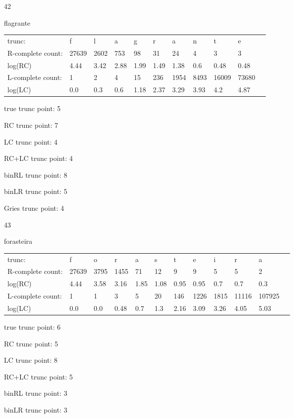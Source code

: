 \documentclass[10pt]{article}
\begin{document}
\vspace{1em}

42

flagrante

\begin{tabular}{l|llllllllll}
trunc: & f & l & a & g & r & a & n & t & e & \\ 
R-complete count: & 27639 & 2602 & 753 & 98 & 31 & 24 & 4 & 3 & 3 & \\ 
log(RC) & 4.44 & 3.42 & 2.88 & 1.99 & 1.49 & 1.38 & 0.6 & 0.48 & 0.48 & \\ 
L-complete count: & 1 & 2 & 4 & 15 & 236 & 1954 & 8493 & 16009 & 73680 & \\ 
log(LC) & 0.0 & 0.3 & 0.6 & 1.18 & 2.37 & 3.29 & 3.93 & 4.2 & 4.87 & \\ 
\end{tabular}

true trunc point: 5

RC trunc point: 7

LC trunc point: 4

RC+LC trunc point: 4

binRL trunc point: 8

binLR trunc point: 5

Gries trunc point: 4

\vspace{1em}

43

forasteira

\begin{tabular}{l|lllllllllll}
trunc: & f & o & r & a & s & t & e & i & r & a & \\ 
R-complete count: & 27639 & 3795 & 1455 & 71 & 12 & 9 & 9 & 5 & 5 & 2 & \\ 
log(RC) & 4.44 & 3.58 & 3.16 & 1.85 & 1.08 & 0.95 & 0.95 & 0.7 & 0.7 & 0.3 & \\ 
L-complete count: & 1 & 1 & 3 & 5 & 20 & 146 & 1226 & 1815 & 11116 & 107925 & \\ 
log(LC) & 0.0 & 0.0 & 0.48 & 0.7 & 1.3 & 2.16 & 3.09 & 3.26 & 4.05 & 5.03 & \\ 
\end{tabular}

true trunc point: 6

RC trunc point: 5

LC trunc point: 8

RC+LC trunc point: 5

binRL trunc point: 3

binLR trunc point: 3
\end{document}

